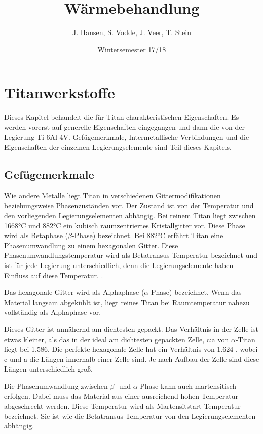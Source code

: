 \documentclass[a4paper, 11pt]{tubsreprt}
\title{Wärmebehandlung}
\date{Wintersemester 17/18}
\author{J. Hansen, S. Vodde,
 J. Veer, T. Stein}
\begin{document}
\maketitle
\tableofcontents
\chapter{Titanwerkstoffe}
Dieses Kapitel behandelt die für Titan charakteristischen Eigenschaften. Es werden vorerst auf generelle Eigenschaften eingegangen und dann die von der Legierung Ti-6Al-4V. Gefügemerkmale, Intermetallische Verbindungen und die Eigenschaften der einzelnen Legierungselemente sind Teil dieses Kapitels.
\section{Gefügemerkmale}\label{Abschnitt Gefügemerkmale}
Wie andere Metalle liegt Titan in verschiedenen Gittermodifikationen beziehungsweise Phasenzuständen vor. Der Zustand ist von der Temperatur und den vorliegenden Legierungselementen abhängig. Bei reinem Titan liegt zwischen 1668°C und 882°C ein kubisch raumzentriertes Kristallgitter vor. Diese Phase wird als Betaphase ($\beta$-Phase) bezeichnet. Bei 882°C erfährt Titan eine Phasenumwandlung zu einem hexagonalen Gitter. Diese Phasenumwandlungstemperatur wird als Betatransus Temperatur bezeichnet und ist für jede Legierung unterschiedlich, denn die Legierungselemente haben Einfluss auf diese Temperatur. \cite{Luetjering2007}.

Das hexagonale Gitter wird als Alphaphase ($\alpha$-Phase) bezeichnet. Wenn das Material langsam abgekühlt ist, liegt reines Titan bei Raumtemperatur nahezu vollständig als Alphaphase vor. 

Dieses Gitter ist annähernd am dichtesten gepackt. Das Verhältnis in der Zelle ist etwas kleiner, als das in der ideal am dichtesten gepackten Zelle, c:a von $\alpha$-Titan liegt bei 1.586. Die perfekte hexagonale Zelle hat ein Verhältnis von 1.624 \cite{Siemers2017}, wobei c und a die Längen innerhalb einer Zelle sind. Je nach Aufbau der Zelle sind diese Längen unterschiedlich groß.

Die Phasenumwandlung zwischen $\beta$- und $\alpha$-Phase kann auch martensitisch erfolgen. Dabei muss das Material aus einer ausreichend hohen Temperatur abgeschreckt werden. Diese Temperatur wird als Martensitstart Temperatur bezeichnet. Sie ist wie die Betatransus Temperatur von den Legierungselementen abhängig.  
\end{document}
